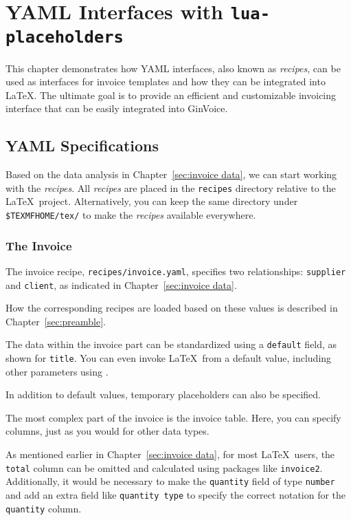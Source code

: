 \section{YAML Interfaces with \texttt{lua-placeholders}}\label{sec:data}

This chapter demonstrates how YAML interfaces, also known as \textit{recipes}, can be used as interfaces for invoice templates and how they can be integrated into \LaTeX.
The ultimate goal is to provide an efficient and customizable invoicing interface that can be easily integrated into GinVoice.

\subsection{YAML Specifications}
Based on the data analysis in Chapter~\ref{sec:invoice data}, we can start working with the \textit{recipes}.
All \textit{recipes} are placed in the \texttt{recipes} directory relative to the \LaTeX\ project.
Alternatively, you can keep the same directory under \texttt{\$TEXMFHOME/tex/} to make the \textit{recipes} available everywhere.

\subsubsection{The Invoice}
The invoice recipe, \texttt{recipes/invoice.yaml}, specifies two relationships: \texttt{supplier} and \texttt{client}, as indicated in Chapter~\ref{sec:invoice data}.

How the corresponding recipes are loaded based on these values is described in Chapter~\ref{sec:preamble}.

The data within the invoice part can be standardized using a \texttt{default} field, as shown for \texttt{title}.
You can even invoke \LaTeX\ from a default value, including other parameters using .

In addition to default values, temporary placeholders can also be specified.

The most complex part of the invoice is the invoice table.
Here, you can specify columns, just as you would for other data types.

As mentioned earlier in Chapter~\ref{sec:invoice data}, for most \LaTeX\ users, the \texttt{total} column can be omitted and calculated using packages like \texttt{invoice2}.
Additionally, it would be necessary to make the \texttt{quantity} field of type \texttt{number} and add an extra field like \texttt{quantity type} to specify the correct notation for the \texttt{quantity} column.

